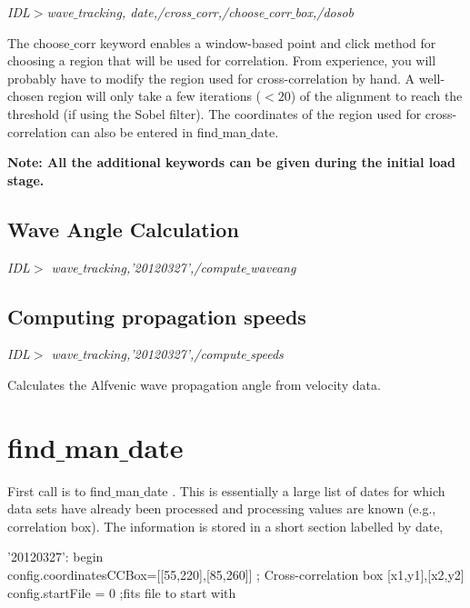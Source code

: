 \documentclass{article}
\begin{document}
\medskip
\textit{IDL$>$wave$\_$tracking, date,/cross$\_$corr,/choose$\_$corr$\_$box,/dosob}
\medskip

The choose$\_$corr keyword enables a window-based point and click method for choosing a region that will be used for correlation. 
From experience, you will probably have to modify the region used for cross-correlation by hand. A well-chosen region will only
take a few iterations ($<20$) of the alignment to reach the threshold (if using the Sobel filter). The coordinates of the 
region used for cross-correlation can also be entered in find$\_$man$\_$date.


\medskip
\textbf{Note: All the additional keywords can be given during the initial load stage.}

\subsection{Wave Angle Calculation}

\textit{IDL$>$ wave$\_$tracking,'20120327',/compute$\_$waveang}

\subsection{Computing propagation speeds}

\textit{IDL$>$ wave$\_$tracking,'20120327',/compute$\_$speeds}


Calculates the Alfvenic wave propagation angle from velocity data.


\section{find$\_$man$\_$date}

First call is to find$\_$man$\_$date . This is essentially a large list of dates for which data sets have already been processed and processing values are known (e.g., correlation box). The information is stored in a short section labelled by date, 


 '20120327': begin\\
 
 \hspace{1.5cm}      config.coordinatesCCBox=[[55,220],[85,260]] ; Cross-correlation box [x1,y1],[x2,y2]\\

 \hspace{1.5cm}      config.startFile = 0                           ;fits file to start with\\
\end{document}
